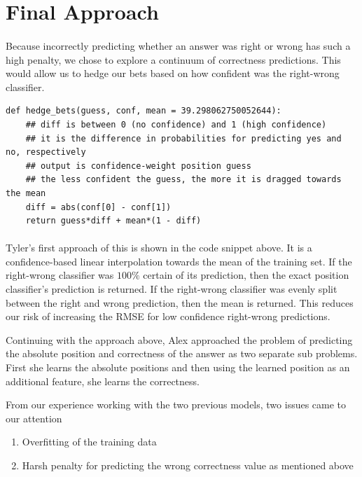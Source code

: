 \documentclass[letterpaper]{article}
\begin{document}
\section{Final Approach}

\paragraph{} Because incorrectly predicting whether an answer was right or wrong has such a high penalty, we chose to explore a continuum of correctness predictions. This would allow us to hedge our bets based on how confident was the right-wrong classifier.

\begin{minipage}{3in}
\begin{verbatim}
def hedge_bets(guess, conf, mean = 39.298062750052644):
    ## diff is between 0 (no confidence) and 1 (high confidence)
    ## it is the difference in probabilities for predicting yes and no, respectively
    ## output is confidence-weight position guess
    ## the less confident the guess, the more it is dragged towards the mean
    diff = abs(conf[0] - conf[1]) 
    return guess*diff + mean*(1 - diff)
\end{verbatim}
\end{minipage}

\paragraph{}

Tyler's first approach of this is shown in the code snippet above. It is a confidence-based linear interpolation towards the mean of the training set. If the right-wrong classifier was $100\%$ certain of its prediction, then the exact position classifier's prediction is returned. If the right-wrong classifier was evenly split between the right and wrong prediction, then the mean is returned. This reduces our risk of increasing the RMSE for low confidence right-wrong predictions.

Continuing with the approach above, Alex approached the problem of predicting the absolute position and correctness of the answer as two separate sub problems.  First she learns the absolute positions and then using the learned position as an additional feature, she learns the correctness.  

From our experience working with the two previous models, two issues came to our attention
\begin{enumerate}
\item Overfitting of the training data
\item Harsh penalty for predicting the wrong correctness value as mentioned above
\end{enumerate}
\end{document}
